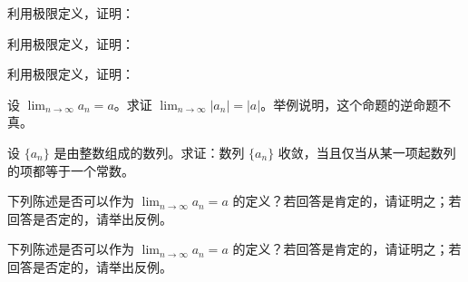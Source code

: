 \noindent\begin{minipage}{\textwidth}
利用极限定义，证明：
\end{minipage}\par\vfill
\noindent\begin{minipage}{\textwidth}
利用极限定义，证明：
\end{minipage}\par\vfill
\newpage
\noindent\begin{minipage}{\textwidth}
利用极限定义，证明：
\end{minipage}\par\vfill
\noindent\begin{minipage}{\textwidth}
设 $\displaystyle\lim_{n\to\infty}a_n=a$。求证 $\displaystyle\lim_{n\to\infty}|a_n|=|a|$。举例说明，这个命题的逆命题不真。
\end{minipage}\par\vfill
\noindent\begin{minipage}{\textwidth}
设 $\{a_n\}$ 是由整数组成的数列。求证：数列 $\{a_n\}$ 收敛，当且仅当从某一项起数列的项都等于一个常数。
\end{minipage}\par\vfill
\newpage
\noindent\begin{minipage}{\textwidth}
下列陈述是否可以作为 $\displaystyle\lim_{n\to\infty}a_n=a$ 的定义？若回答是肯定的，请证明之；若回答是否定的，请举出反例。
\end{minipage}\par\vfill
\noindent\begin{minipage}{\textwidth}
下列陈述是否可以作为 $\displaystyle\lim_{n\to\infty}a_n=a$ 的定义？若回答是肯定的，请证明之；若回答是否定的，请举出反例。
\end{minipage}\par\vfill
